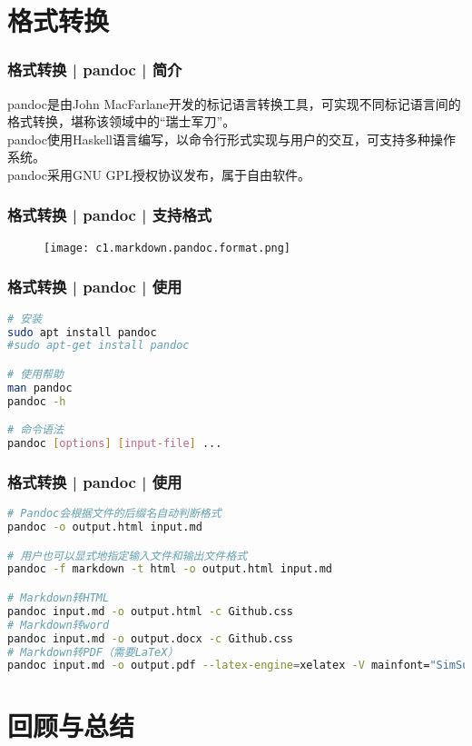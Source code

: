 \section{格式转换}
\begin{frame}
  \frametitle{格式转换 | pandoc | 简介}
  pandoc是由John MacFarlane开发的标记语言转换工具，可实现不同标记语言间的格式转换，堪称该领域中的“瑞士军刀”。\\
  \vspace{1em}
  pandoc使用Haskell语言编写，以命令行形式实现与用户的交互，可支持多种操作系统。\\
  \vspace{1em}
  pandoc采用GNU GPL授权协议发布，属于自由软件。
\end{frame}

\begin{frame}
  \frametitle{格式转换 | pandoc | 支持格式}
  \begin{figure}
    \centering
    \texttt{[image: c1.markdown.pandoc.format.png]}
  \end{figure}
\end{frame}

\begin{frame}[fragile]
  \frametitle{格式转换 | pandoc | 使用}
\begin{lstlisting}[language=bash]
# 安装
sudo apt install pandoc
#sudo apt-get install pandoc

# 使用帮助
man pandoc
pandoc -h

# 命令语法
pandoc [options] [input-file] ...
\end{lstlisting}
\end{frame}

\begin{frame}[fragile]
  \frametitle{格式转换 | pandoc | \alert{使用}}
\begin{lstlisting}[language=bash]
# Pandoc会根据文件的后缀名自动判断格式
pandoc -o output.html input.md

# 用户也可以显式地指定输入文件和输出文件格式
pandoc -f markdown -t html -o output.html input.md

# Markdown转HTML
pandoc input.md -o output.html -c Github.css
# Markdown转word
pandoc input.md -o output.docx -c Github.css
# Markdown转PDF（需要LaTeX）
pandoc input.md -o output.pdf --latex-engine=xelatex -V mainfont="SimSun" --template=template.latex
\end{lstlisting}
\end{frame}

\section{回顾与总结}
